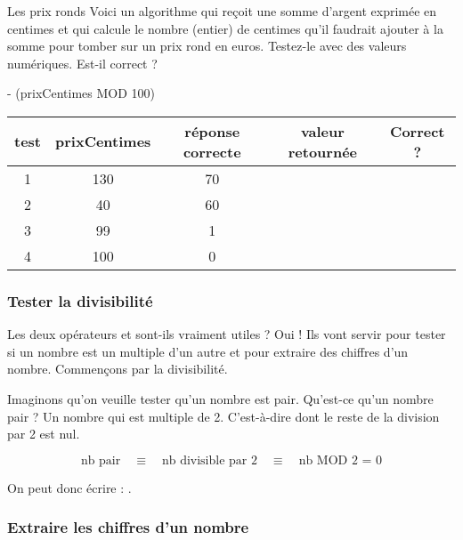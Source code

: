 			\begin{Exercice}{Les prix ronds}
				Voici un algorithme qui reçoit une somme d'argent exprimée en centimes
				et qui calcule le nombre (entier) de centimes qu'il
				faudrait ajouter à la somme pour tomber sur un prix rond en euros.
				Testez-le avec des valeurs numériques. Est-il correct ?
				
				\begin{LDA}
					 - (prixCentimes MOD 100)
				\EndAlgo
				\end{LDA}
				
				\begin{center}
				\begin{tabular}{|c|c|c|c|c|}
				\hline
				test \no & prixCentimes & réponse correcte & valeur retournée & Correct ? \\\hline
				\hline 
				1 & 130 & 70 &  & \\\hline
				2 & 40  & 60 &  & \\\hline
				3 & 99  & 1  &  & \\\hline
				4 & 100 & 0  &  & \\\hline
				\end{tabular}
				\end{center}
				
			\end{Exercice}
			
			
			\subsubsection{Tester la divisibilité}
			
				Les deux opérateurs  et 
				sont-ils vraiment utiles ?
				Oui ! Ils vont servir pour tester si un nombre
				est un multiple d'un autre et pour extraire
				des chiffres d'un nombre.
				Commençons par la divisibilité.

				Imaginons qu'on veuille tester qu'un nombre est pair.
				Qu'est-ce qu'un nombre pair ? Un nombre qui est multiple de 2.
				C'est-à-dire dont le reste de la division par 2 est nul.
				
				\[
				\textrm{nb pair} 
					\quad\equiv\quad \textrm{nb divisible par 2} 
					\quad\equiv\quad \textrm{nb MOD 2 = 0} 
				\]
				
				On peut donc écrire : .
	
			\subsubsection{Extraire les chiffres d'un nombre}
			
